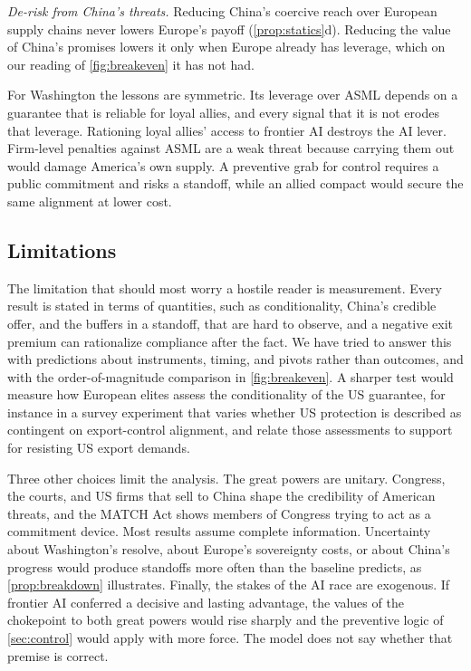 \emph{De-risk from China's threats.} Reducing China's coercive reach over European supply chains never lowers Europe's payoff (\cref{prop:statics}d). Reducing the value of China's promises lowers it only when Europe already has leverage, which on our reading of \cref{fig:breakeven} it has not had.

For Washington the lessons are symmetric. Its leverage over ASML depends on a guarantee that is reliable for loyal allies, and every signal that it is not erodes that leverage. Rationing loyal allies' access to frontier AI destroys the AI lever. Firm-level penalties against ASML are a weak threat because carrying them out would damage America's own supply. A preventive grab for control requires a public commitment and risks a standoff, while an allied compact would secure the same alignment at lower cost.

\subsection{Limitations}

The limitation that should most worry a hostile reader is measurement. Every result is stated in terms of quantities, such as conditionality, China's credible offer, and the buffers in a standoff, that are hard to observe, and a negative exit premium can rationalize compliance after the fact. We have tried to answer this with predictions about instruments, timing, and pivots rather than outcomes, and with the order-of-magnitude comparison in \cref{fig:breakeven}. A sharper test would measure how European elites assess the conditionality of the US guarantee, for instance in a survey experiment that varies whether US protection is described as contingent on export-control alignment, and relate those assessments to support for resisting US export demands.

Three other choices limit the analysis. The great powers are unitary. Congress, the courts, and US firms that sell to China shape the credibility of American threats, and the MATCH Act shows members of Congress trying to act as a commitment device. Most results assume complete information. Uncertainty about Washington's resolve, about Europe's sovereignty costs, or about China's progress would produce standoffs more often than the baseline predicts, as \cref{prop:breakdown} illustrates. Finally, the stakes of the AI race are exogenous. If frontier AI conferred a decisive and lasting advantage, the values of the chokepoint to both great powers would rise sharply and the preventive logic of \cref{sec:control} would apply with more force. The model does not say whether that premise is correct.
